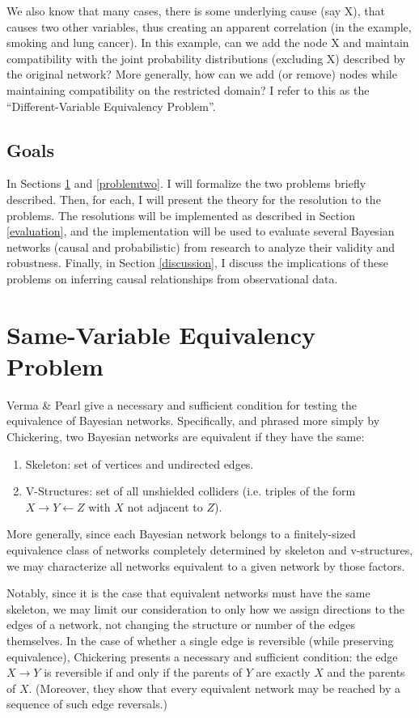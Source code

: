 \documentclass{article}
\newcommand{\problemone}{Same-Variable Equivalency Problem}
\newcommand{\problemtwo}{Different-Variable Equivalency Problem}
\begin{document}
	We also know that many cases, there is some underlying cause (say X), that causes two other variables, thus creating an apparent correlation (in the example, smoking and lung cancer). In this example, can we add the node X and maintain compatibility with the joint probability distributions (excluding X) described by the original network? More generally, how can we add (or remove) nodes while maintaining compatibility on the restricted domain? I refer to this as the ``\problemtwo''.
	
	\subsection{Goals}
	In Sections \ref{problemone} and \ref{problemtwo}. I will formalize the two problems briefly described.
	Then, for each, I will present the theory for the resolution to the problems.
	The resolutions will be implemented as described in Section \ref{evaluation}, and the implementation will be used to evaluate several Bayesian networks (causal and probabilistic) from research to analyze their validity and robustness.
	Finally, in Section \ref{discussion}, I discuss the implications of these problems on inferring causal relationships from observational data.


	\section{\problemone}
	\label{problemone}
	
	Verma \& Pearl\cite{verma2013equivalence} give a necessary and sufficient condition for testing the equivalence of Bayesian networks.
	Specifically, and phrased more simply by Chickering\cite{chickering2013transformational}, two Bayesian networks are equivalent if they have the same:
	\begin{enumerate}
		\item Skeleton: set of vertices and undirected edges.
		\item V-Structures: set of all unshielded colliders (i.e. triples of the form $X \rightarrow Y \leftarrow Z$ with $X$ not adjacent to $Z$).
	\end{enumerate}
	More generally, since each Bayesian network belongs to a finitely-sized equivalence class of networks completely determined by skeleton and v-structures, we may characterize all networks equivalent to a given network by those factors.
	
	Notably, since it is the case that equivalent networks must have the same skeleton, we may limit our consideration to only how we assign directions to the edges of a network, not changing the structure or number of the edges themselves.
	In the case of whether a single edge is reversible (while preserving equivalence), Chickering\cite{chickering2013transformational} presents a necessary and sufficient condition: the edge $X \rightarrow Y$ is reversible if and only if the parents of $Y$ are exactly $X$ and the parents of $X$.
	(Moreover, they show that every equivalent network may be reached by a sequence of such edge reversals.)
	
\end{document}

